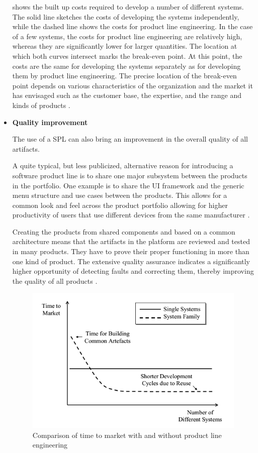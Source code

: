 \begin{itemize}
 shows the built up costs required to develop a number of different systems. The solid line sketches the costs of developing the systems independently, while the dashed line shows the costs for product line engineering. In the case of a few systems, the costs for product line engineering are relatively high, whereas they are significantly lower for larger quantities. The location at which both curves intersect marks the break-even point. At this point, the costs are the same for developing the systems separately as for developing them by product line engineering. The precise location of the break-even point depends on various characteristics of the organization and the market it has envisaged such as the customer base, the expertise, and the range and kinds of products \citep{Pohl2005}.

\item \textbf{Quality improvement}


The use of a \acf{SPL} can also bring an improvement in the overall quality of all artifacts.

A quite typical, but less publicized, alternative reason for introducing a software product line is to share one major subsystem between the products in the portfolio. One example is to share the UI framework and the generic menu structure and use cases between the products. This allows for a common look and feel across the product portfolio allowing for higher productivity of users that use different devices from the same manufacturer \citep{rafael2013systems}.

Creating the products from shared components and based on a common architecture means that the artifacts in the platform are reviewed and tested in many products. They have to prove their proper functioning in more than one kind of product. The extensive quality assurance indicates a significantly higher opportunity of detecting faults and correcting them, thereby improving the quality of all products \citep{Pohl2005}.


\begin{figure}[htp]
\begin{center}
  \includegraphics[width=11cm]{chapters/background/img/spl-timetomarket.png}
  \caption[Comparison of time to market with and without product line engineering]{Comparison of time to market with and without product line engineering}
  \label{fg:spl-timetomarket}
\end{center}
\end{figure}


\end{itemize}
